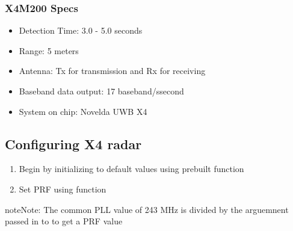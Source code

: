 \documentclass[letterpaper,10pt,english]{sphinxmanual}
\begin{document}
\subsubsection{X4M200 Specs}
\label{\detokenize{Radar information:x4m200-specs}}\begin{itemize}
\item {} 
Detection Time: 3.0  - 5.0 seconds

\item {} 
Range: 5 meters

\item {} 
Antenna: Tx for transmission and Rx for receiving

\item {} 
Baseband data output: 17 baseband/ssecond

\item {} 
System on chip: Novelda UWB X4

\end{itemize}


\subsection{Configuring X4 radar}
\label{\detokenize{Radar information:configuring-x4-radar}}\begin{enumerate}
\def\theenumi{\arabic{enumi}}
\def\labelenumi{\theenumi .}
\makeatletter\def\p@enumii{\p@enumi \theenumi .}\makeatother
\item {} 
Begin by initializing to default values using prebuilt function 

\item {} 
Set PRF using function 

\end{enumerate}

\begin{sphinxadmonition}{note}{Note:}
The common PLL value of 243 MHz is divided by the arguemnent passed in to  to get a PRF value
\end{sphinxadmonition}
\end{document}

